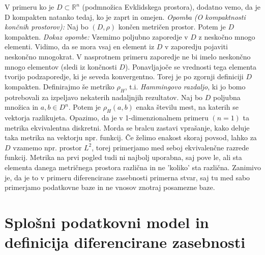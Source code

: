 \documentclass[mat1]{article}
\theoremstyle{definition}
\begin{document}
\newline
V primeru ko je $D \subset \mathbb{R}^n$ (podmnožica Evklidskega prostora), dodatno vemo, da je D kompakten natanko tedaj, ko je zaprt in omejen.
\newline
\newline
\textit{Opomba (O kompaktnosti končnih prostorov):}
Naj bo $(D, \rho)$ končen metričen prostor. Potem je $D$ kompakten.
\newline
\newline
\textit{Dokaz opombe:} Vzemimo poljubno zaporedje v $D$ z neskočno mnogo elementi. Vidimo, da se mora vsaj en element iz $D$ v zaporedju pojaviti neskončno mnogokrat. V nasprotnem primeru zaporedje ne bi imelo neskončno mnogo elementov (sledi iz končnosti $D$). Ponavljajoče se vrednosti tega elementa tvorijo podzaporedje, ki je seveda konvergentno. Torej je po zgornji definiciji $D$ kompakten.
\newline
\newline
Definirajmo še metriko $\rho_H$, t.i. \textit{Hammingovo razdaljo}, ki jo bomo potrebovali za izpeljavo nekaterih nadaljnjih rezultatov. Naj bo $D$ poljubna množica in $a , b \in D^n$. Potem je $\rho_H(a,b)$ enaka številu mest, na katerih se vektorja razlikujeta. Opazimo, da je v 1-dimenzionalnem primeru $(n=1)$ ta metrika ekvivalentna diskretni. Morda se bralcu zastavi vprašanje, kako deluje taka metrika na vektorju npr. funkcij. Če želimo enakost skoraj povsod, lahko za $D$ vzamemo npr. prostor $L^2$, torej primerjamo med seboj ekvivalenčne razrede funkcij.  Metrika na prvi pogled tudi ni najbolj uporabna, saj pove le, ali sta elementa danega metričnega prostora različna in ne 'koliko' sta različna. Zanimivo je, da je to v primeru diferencirane zasebnosti primerna stvar, saj tu med sabo primerjamo podatkovne baze in ne vnosov znotraj posamezne baze. 
\section{Splošni podatkovni model in definicija diferencirane zasebnosti}
\end{document}
